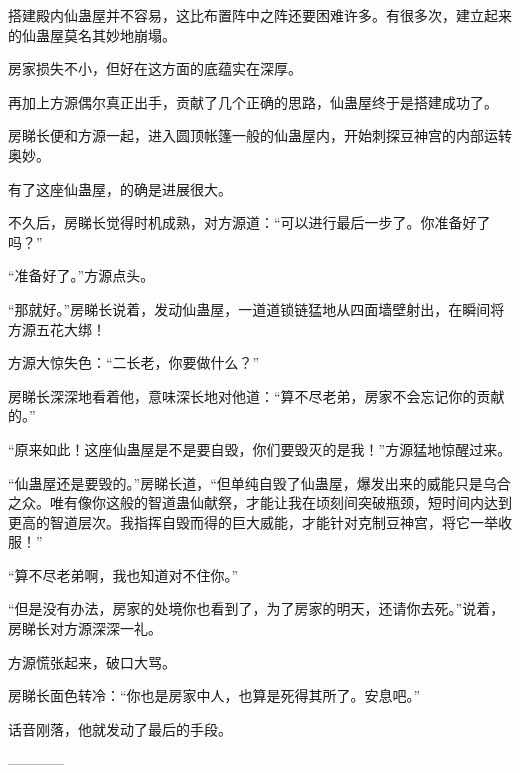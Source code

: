 \begin{this_body}
搭建殿内仙蛊屋并不容易，这比布置阵中之阵还要困难许多。有很多次，建立起来的仙蛊屋莫名其妙地崩塌。

房家损失不小，但好在这方面的底蕴实在深厚。

再加上方源偶尔真正出手，贡献了几个正确的思路，仙蛊屋终于是搭建成功了。

房睇长便和方源一起，进入圆顶帐篷一般的仙蛊屋内，开始刺探豆神宫的内部运转奥妙。

有了这座仙蛊屋，的确是进展很大。

不久后，房睇长觉得时机成熟，对方源道：“可以进行最后一步了。你准备好了吗？”

“准备好了。”方源点头。

“那就好。”房睇长说着，发动仙蛊屋，一道道锁链猛地从四面墙壁射出，在瞬间将方源五花大绑！

方源大惊失色：“二长老，你要做什么？”

房睇长深深地看着他，意味深长地对他道：“算不尽老弟，房家不会忘记你的贡献的。”

“原来如此！这座仙蛊屋是不是要自毁，你们要毁灭的是我！”方源猛地惊醒过来。

“仙蛊屋还是要毁的。”房睇长道，“但单纯自毁了仙蛊屋，爆发出来的威能只是乌合之众。唯有像你这般的智道蛊仙献祭，才能让我在顷刻间突破瓶颈，短时间内达到更高的智道层次。我指挥自毁而得的巨大威能，才能针对克制豆神宫，将它一举收服！”

“算不尽老弟啊，我也知道对不住你。”

“但是没有办法，房家的处境你也看到了，为了房家的明天，还请你去死。”说着，房睇长对方源深深一礼。

方源慌张起来，破口大骂。

房睇长面色转冷：“你也是房家中人，也算是死得其所了。安息吧。”

话音刚落，他就发动了最后的手段。

------------

\end{this_body}


